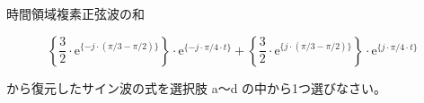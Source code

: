 時間領域複素正弦波の和

\[
\left \{ \frac{3}{2} \cdot \textrm{e}^{\{-j \cdot (\pi/3 - \pi/2) \}} \right \} \cdot \textrm{e}^{\{-j \cdot \pi/4 \cdot t \}} +  
\left \{ \frac{3}{2} \cdot \textrm{e}^{\{ j \cdot (\pi/3 - \pi/2) \}} \right \} \cdot \textrm{e}^{\{j \cdot \pi/4 \cdot t \}}
\]

\bigskip
\noindent から復元したサイン波の式を選択肢 a〜d の中から1つ選びなさい。
